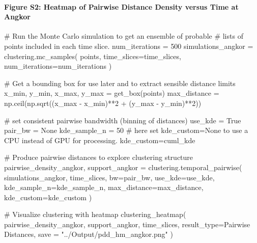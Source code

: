 \documentclass[
  11pt,
  letterpaper,
  DIV=11,
  numbers=noendperiod]{scrartcl}
\let\oldparagraph\paragraph
\renewcommand{\paragraph}[1]{\oldparagraph{#1}\mbox{}}
\newenvironment{Shaded}{\begin{snugshade}}{\end{snugshade}}
\newcommand{\CommentTok}[1]{\textcolor[rgb]{0.37,0.37,0.37}{#1}}
\newcommand{\DecValTok}[1]{\textcolor[rgb]{0.68,0.00,0.00}{#1}}
\newcommand{\NormalTok}[1]{\textcolor[rgb]{0.00,0.23,0.31}{#1}}
\newcommand{\OperatorTok}[1]{\textcolor[rgb]{0.37,0.37,0.37}{#1}}
\newcommand{\StringTok}[1]{\textcolor[rgb]{0.13,0.47,0.30}{#1}}
\newcommand{\VariableTok}[1]{\textcolor[rgb]{0.07,0.07,0.07}{#1}}
\begin{document}
\paragraph{Figure S2: Heatmap of Pairwise Distance Density versus Time
at
Angkor}\label{figure-s2-heatmap-of-pairwise-distance-density-versus-time-at-angkor}

\begin{Shaded}
\begin{Highlighting}[]
\CommentTok{\# Run the Monte Carlo simulation to get an ensemble of probable }
\CommentTok{\# lists of points included in each time slice.}
\NormalTok{num\_iterations }\OperatorTok{=} \DecValTok{500}
\NormalTok{simulations\_angkor }\OperatorTok{=}\NormalTok{ clustering.mc\_samples(}
\NormalTok{    points, }
\NormalTok{    time\_slices}\OperatorTok{=}\NormalTok{time\_slices,  }
\NormalTok{    num\_iterations}\OperatorTok{=}\NormalTok{num\_iterations}
\NormalTok{)}

\CommentTok{\# Get a bounding box for use later and to extract sensible distance limits}
\NormalTok{x\_min, y\_min, x\_max, y\_max }\OperatorTok{=}\NormalTok{ get\_box(points)}
\NormalTok{max\_distance }\OperatorTok{=}\NormalTok{ np.ceil(np.sqrt((x\_max }\OperatorTok{{-}}\NormalTok{ x\_min)}\OperatorTok{**}\DecValTok{2} \OperatorTok{+}\NormalTok{ (y\_max }\OperatorTok{{-}}\NormalTok{ y\_min)}\OperatorTok{**}\DecValTok{2}\NormalTok{))}

\CommentTok{\# set consistent pairwise bandwidth (binning of distances)}
\NormalTok{use\_kde }\OperatorTok{=} \VariableTok{True}
\NormalTok{pair\_bw }\OperatorTok{=} \VariableTok{None}
\NormalTok{kde\_sample\_n }\OperatorTok{=} \DecValTok{50}
\CommentTok{\# here set kde\_custom=None to use a CPU instead of GPU for processing.}
\NormalTok{kde\_custom}\OperatorTok{=}\NormalTok{cuml\_kde}

\CommentTok{\# Produce pairwise distances to explore clustering structure}
\NormalTok{pairwise\_density\_angkor, support\_angkor }\OperatorTok{=}\NormalTok{ clustering.temporal\_pairwise(}
\NormalTok{    simulations\_angkor, }
\NormalTok{    time\_slices,}
\NormalTok{    bw}\OperatorTok{=}\NormalTok{pair\_bw, }
\NormalTok{    use\_kde}\OperatorTok{=}\NormalTok{use\_kde, }
\NormalTok{    kde\_sample\_n}\OperatorTok{=}\NormalTok{kde\_sample\_n,}
\NormalTok{    max\_distance}\OperatorTok{=}\NormalTok{max\_distance,}
\NormalTok{    kde\_custom}\OperatorTok{=}\NormalTok{kde\_custom}
\NormalTok{)}

\CommentTok{\# Visualize clustering with heatmap}
\NormalTok{clustering\_heatmap(}
\NormalTok{    pairwise\_density\_angkor,}
\NormalTok{    support\_angkor,}
\NormalTok{    time\_slices,}
\NormalTok{    result\_type}\OperatorTok{=}\StringTok{\textquotesingle{}Pairwise Distances\textquotesingle{}}\NormalTok{,}
\NormalTok{    save }\OperatorTok{=} \StringTok{"../Output/pdd\_hm\_angkor.png"}
\NormalTok{)}
\end{Highlighting}
\end{Shaded}
\end{document}
